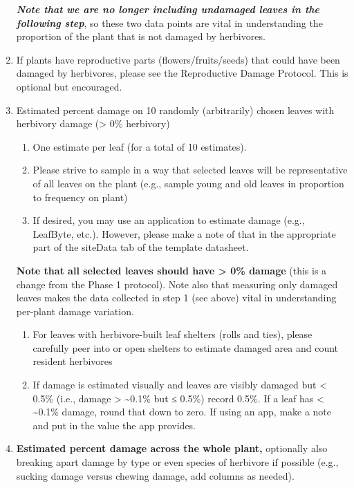 \documentclass[
  letterpaper,
  oneside,
  open=any]{scrbook}
\begin{document}
\begin{enumerate}
  \textbf{\emph{Note that we are no longer including undamaged leaves in
  the following step}}, so these two data points are vital in
  understanding the proportion of the plant that is not damaged by
  herbivores.
\item
  If plants have reproductive parts (flowers/fruits/seeds) that could
  have been damaged by herbivores, please see the Reproductive Damage
  Protocol. This is optional but encouraged.
\item
  Estimated percent damage on 10 randomly (arbitrarily) chosen leaves
  with herbivory damage (\textgreater{} 0\% herbivory)

  \begin{enumerate}
  \def\labelenumii{\alph{enumii}.}
  \item
    One estimate per leaf (for a total of 10 estimates).
  \item
    Please strive to sample in a way that selected leaves will be
    representative of all leaves on the plant (e.g., sample young and
    old leaves in proportion to frequency on plant)
  \item
    If desired, you may use an application to estimate damage (e.g.,
    LeafByte, etc.). However, please make a note of that in the
    appropriate part of the siteData tab of the template datasheet.
  \end{enumerate}

  \textbf{Note that all selected leaves should have \textgreater{} 0\%
  damage} (this is a change from the Phase 1 protocol). Note also that
  measuring only damaged leaves makes the data collected in step 1 (see
  above) vital in understanding per-plant damage variation.

  \begin{enumerate}
  \def\labelenumii{\alph{enumii}.}
  \setcounter{enumii}{3}
  \item
    For leaves with herbivore-built leaf shelters (rolls and ties),
    please carefully peer into or open shelters to estimate damaged area
    and count resident herbivores
  \item
    If damage is estimated visually and leaves are visibly damaged but
    \textless{} 0.5\% (i.e., damage \textgreater{} \textasciitilde0.1\%
    but ≤ 0.5\%) record 0.5\%. If a leaf has \textless{}
    \textasciitilde0.1\% damage, round that down to zero. If using an
    app, make a note and put in the value the app provides.
  \end{enumerate}
\item
  \textbf{Estimated percent damage across the whole plant,} optionally
  also breaking apart damage by type or even species of herbivore if
  possible (e.g., sucking damage versus chewing damage, add columns as
  needed).


\end{enumerate}
\end{document}
